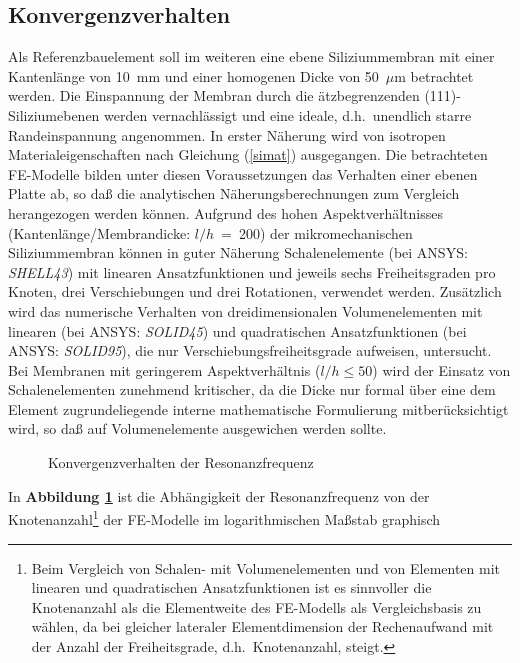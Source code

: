 \subsection{Konvergenzverhalten}
\label{konvergenzverhalten}

Als Referenzbauelement soll im weiteren eine ebene Siliziummembran mit einer
Kantenlänge von 10~mm und einer homogenen Dicke von 50~$\mu$m betrachtet
werden. Die Einspannung der Membran durch die ätzbegrenzenden
(111)-Siliziumebenen werden vernachlässigt und eine ideale, d.h.\
unendlich starre Randeinspannung angenommen. In erster Näherung wird von
isotropen Materialeigenschaften nach Gleichung (\ref{simat}) ausgegangen.
Die betrachteten FE-Modelle bilden unter
diesen Voraussetzungen das Verhalten einer ebenen Platte ab, so daß die
analytischen Näherungsberechnungen zum Vergleich herangezogen werden können.
Aufgrund des hohen Aspektverhältnisses
(Kantenlänge/Membrandicke: $l/h$~=~200) der mikromechanischen
Siliziummembran können in guter Näherung Schalenelemente
(bei {\sf ANSYS}: {\em SHELL43})
mit linearen Ansatzfunktionen und jeweils sechs Freiheitsgraden pro Knoten,
drei Verschiebungen und drei Rotationen, verwendet werden.
Zusätzlich wird das numerische Verhalten von dreidimensionalen
Volumenelementen mit linearen (bei {\sf ANSYS}: {\em SOLID45})
und quadratischen Ansatzfunktionen (bei {\sf ANSYS}: {\em SOLID95}),
die nur Verschiebungsfreiheitsgrade
aufweisen, untersucht. Bei Membranen mit geringerem Aspektverhältnis
($l/h \leq 50$) wird der Einsatz von Schalenelementen zunehmend kritischer,
da die Dicke nur formal über eine dem Element zugrundeliegende interne
mathematische Formulierung mitberücksichtigt wird, so daß auf
Volumenelemente ausgewichen werden sollte.\\
\begin{figure}[htb]
\begin{center}

\setabbve
\end{center}
\caption{\label{abbkonvfreq}
  Konvergenzverhalten der Resonanzfrequenz}
\end{figure}
In {\bf Abbildung \ref{abbkonvfreq}} ist die Abhängigkeit der
Resonanzfrequenz von der Knotenanzahl\footnote{Beim Vergleich von Schalen-
mit Volumenelementen und von Elementen mit linearen und quadratischen
Ansatzfunktionen ist es sinnvoller die Knotenanzahl als die Elementweite
des FE-Modells als
Vergleichsbasis zu wählen, da bei gleicher lateraler Elementdimension
der Rechenaufwand mit der Anzahl der Freiheitsgrade, d.h.\ Knotenanzahl,
steigt.} der FE-Modelle im logarithmischen Maßstab graphisch
